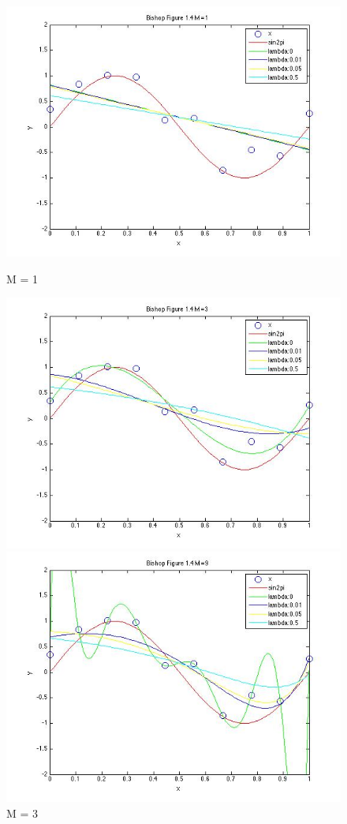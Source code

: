 \begin{figure}[!htb]
  \includegraphics[width=\linewidth]{figures/p3_bishop_m=1}
  \caption{M = 1}\label{fig:figures/p3_bishop_m=1}
\endminipage\hfill
{}
  \includegraphics[width=\linewidth]{figures/p3_bishop_m=3}
  \caption{M = 3}\label{fig:figures/p3_bishop_m=3}
\endminipage\hfill
{}%
  \includegraphics[width=\linewidth]{figures/p3_bishop_m=9}

\end{figure}
